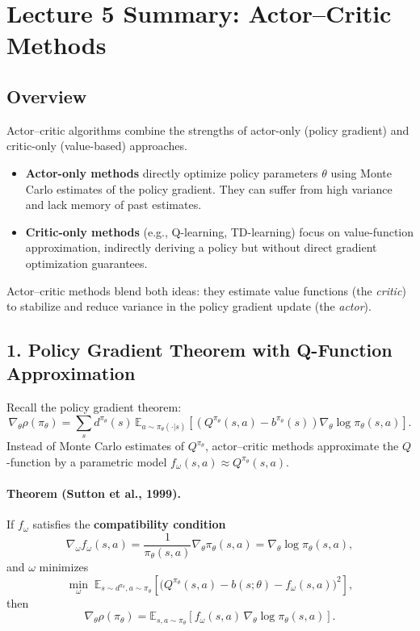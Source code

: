 \documentclass[12pt]{article}
\begin{document}
\psetheader %

\section*{Lecture 5 Summary: Actor--Critic Methods}

\subsection*{Overview}
Actor--critic algorithms combine the strengths of actor-only (policy gradient) and
critic-only (value-based) approaches.
\begin{itemize}
		\item \textbf{Actor-only methods} directly optimize policy parameters $\theta$ using
				Monte Carlo estimates of the policy gradient. They can suffer from high variance and
				lack memory of past estimates.
		\item \textbf{Critic-only methods} (e.g., Q-learning, TD-learning) focus on
				value-function approximation, indirectly deriving a policy but without direct
				gradient optimization guarantees.
\end{itemize}
Actor--critic methods blend both ideas: they estimate value functions (the \emph{critic})
to stabilize and reduce variance in the policy gradient update (the \emph{actor}).

\subsection*{1. Policy Gradient Theorem with Q-Function Approximation}
Recall the policy gradient theorem:
\[
		\nabla_\theta \rho(\pi_\theta)
		= \sum_s d^{\pi_\theta}(s) \, \mathbb{E}_{a \sim \pi_\theta(\cdot|s)}
		\left[ (Q^{\pi_\theta}(s,a) - b^{\pi_\theta}(s)) \nabla_\theta \log \pi_\theta(s,a) \right].
\]
Instead of Monte Carlo estimates of $Q^{\pi_\theta}$, actor--critic methods approximate
the $Q$-function by a parametric model $f_\omega(s,a) \approx Q^{\pi_\theta}(s,a)$.

\paragraph{Theorem (Sutton et al., 1999).}
If $f_\omega$ satisfies the \textbf{compatibility condition}
\[
		\nabla_\omega f_\omega(s,a)
		= \frac{1}{\pi_\theta(s,a)} \nabla_\theta \pi_\theta(s,a)
		= \nabla_\theta \log \pi_\theta(s,a),
\]
and $\omega$ minimizes
\[
		\min_\omega \; \mathbb{E}_{s \sim d^{\pi_\theta}, a \sim \pi_\theta}
		\!\left[ \big(Q^{\pi_\theta}(s,a) - b(s;\theta) - f_\omega(s,a)\big)^2 \right],
\]
then
\[
		\nabla_\theta \rho(\pi_\theta)
		= \mathbb{E}_{s,a \sim \pi_\theta} \!\left[f_\omega(s,a)\,\nabla_\theta \log
		\pi_\theta(s,a)\right].
\]
\end{document}
